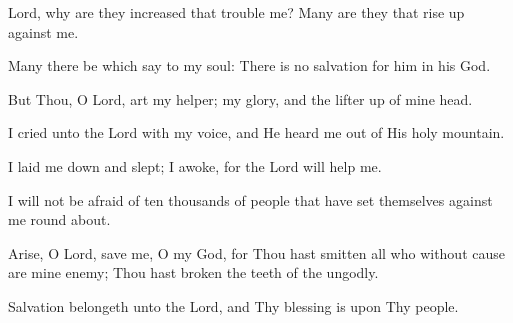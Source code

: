 Lord, why are they increased that trouble me? Many are they that rise up against me.

Many there be which say to my soul: There is no salvation for him in his God.

But Thou, O Lord, art my helper; my glory, and the lifter up of mine head.

I cried unto the Lord with my voice, and He heard me out of His holy mountain.

I laid me down and slept; I awoke, for the Lord will help me.

I will not be afraid of ten thousands of people that have set themselves against me round about.

Arise, O Lord, save me, O my God, for Thou hast smitten all who without cause are mine enemy; Thou hast broken the teeth of the ungodly.

Salvation belongeth unto the Lord, and Thy blessing is upon Thy people.
